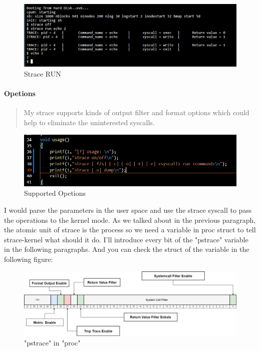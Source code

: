 \documentclass[11pt,oneside,a4paper]{article}
\begin{document}
\begin{figure}[H]
    \includegraphics[width=4.75in]{1-18.png}
    \centering
    \caption{Strace RUN}
\end{figure}

\paragraph*{Opetions}

\begin{quotation}
    My strace supports kinds of output filter and format options which could help to 
eliminate the uninterested syscalls. 
\end{quotation}

\begin{figure}[H]
    \includegraphics[width=4.75in]{1-19.png}
    \centering
    \caption{Supported Opetions}
\end{figure}

I would parse the parameters in the user space and use the strace syscall to 
pass the operations to the kernel mode. 
As we talked about in the previous paragraph, the atomic unit of strace is the process so 
we need a variable in proc struct to tell strace-kernel what should it do. I'll 
introduce every bit of the "pstrace" variable in the following paragraphs. And you can 
check the struct of the variable in the following figure:

\begin{figure}[H]
    \includegraphics[width=4.75in]{pstrace.png}
    \centering
    \caption{"pstrace" in "proc"}
\end{figure}
\end{document}
